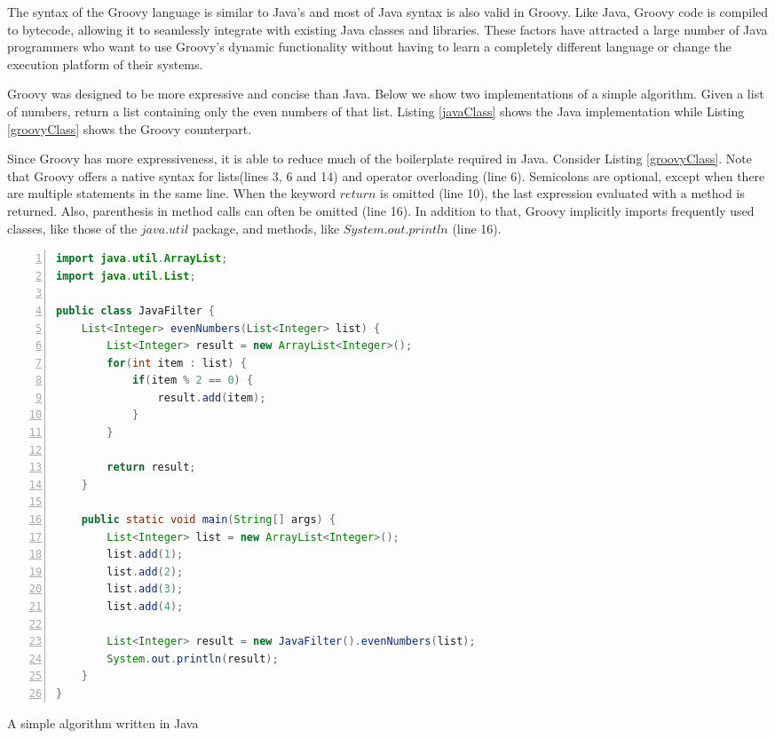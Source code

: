 \documentclass[preprint]{sigplanconf}
\begin{document}
The syntax of the Groovy language is similar to Java's and most of Java syntax is also valid in Groovy.
Like Java, Groovy code is compiled to bytecode, allowing it to seamlessly integrate with existing Java classes and libraries. 
These factors have attracted a large number of Java programmers who want to use Groovy's dynamic functionality without having to learn a completely different language or change the execution platform of their systems. 

Groovy was designed to be more expressive and concise than Java.
Below we show two implementations of a simple algorithm.
Given a list of numbers, return a list containing only the even numbers of that list.
Listing \ref{javaClass} shows the Java implementation while Listing \ref{groovyClass} shows the Groovy counterpart. 

Since Groovy has more expressiveness, it is able to reduce much of the boilerplate required in Java.
Consider Listing \ref{groovyClass}.
Note that Groovy offers a native syntax for lists(lines 3, 6 and 14) and operator overloading (line 6). 
Semicolons are optional, except when there are multiple statements in the same line. 
When the keyword $return$ is omitted (line 10), the last expression evaluated with a method is returned. 
Also, parenthesis in method calls can often be omitted (line 16).
In addition to that, Groovy implicitly imports frequently used classes, like those of the $java.util$ package, and methods, like $System.out.println$ (line 16).

\begin{Listing}[ht]
\begin{lstlisting}[language=Java,tabsize=2,breaklines=true,numbers=left]
import java.util.ArrayList;
import java.util.List;

public class JavaFilter {
	List<Integer> evenNumbers(List<Integer> list) {
		List<Integer> result = new ArrayList<Integer>();
		for(int item : list) {
			if(item % 2 == 0) {
				result.add(item);
			}
		}

		return result;
	}

	public static void main(String[] args) {
		List<Integer> list = new ArrayList<Integer>();
		list.add(1);
		list.add(2);
		list.add(3);
		list.add(4);

		List<Integer> result = new JavaFilter().evenNumbers(list);
		System.out.println(result);
	}
}
\end{lstlisting}
\caption{A simple algorithm written in Java}
\label{javaClass}
\end{Listing}
\end{document}
